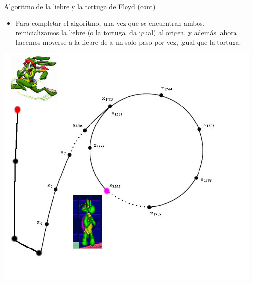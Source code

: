 \documentclass{beamer}
\begin{document}
\begin{frame}{Algoritmo de la liebre y la tortuga de Floyd (cont)}
    \begin{itemize}
    \item Para completar el algoritmo, una vez que se encuentran ambos, reinicializamos la liebre (o la tortuga, da igual) al origen, y además, ahora hacemos moverse a la liebre de a un solo paso por vez, igual que la tortuga.
    \end{itemize}
    {\hfill \includegraphics[scale=0.35]{hare_tortoise_rho_cycle3.jpg} \hfill}
\end{frame}
\end{document}
